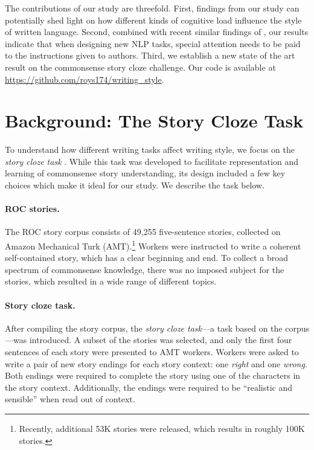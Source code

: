 \documentclass[11pt,a4paper]{article}
\newcommand{\isection}[2]{\section{#1}\label{ssec:#2}}
\begin{document}
The contributions of our study are threefold. 
First, findings from our study can potentially shed light on 
how different kinds of cognitive load influence the style of written language. 
Second, combined with recent similar findings of \cite{Cai:2017}, our results indicate that when designing new NLP tasks, special attention needs to be paid to the instructions given to authors.
Third, we establish a new state of the art result on the commonsense story cloze challenge. 
Our code is available at \url{https://github.com/roys174/writing_style}.

\isection{Background: The Story Cloze Task}{ROC_Story}
To understand how different writing tasks affect writing style, 
we focus on the \textit{story cloze task} \cite{Mostafazadeh:2016}. 
While this task was developed to facilitate representation and learning of commonsense story understanding,
its design included a few key choices which  make it ideal for our study. 
We describe the task below.




\paragraph{ROC stories.}

The ROC story corpus consists of 49,255 five-sentence 
stories, collected on Amazon Mechanical Turk (AMT).\footnote{Recently,
  additional 53K stories were released, which results in roughly
  100K stories.}
Workers were instructed to write a coherent self-contained story, which has a clear beginning and end. 
To collect a broad spectrum of commonsense knowledge, there was no imposed subject for the stories,
which resulted in a wide range of different topics.

\paragraph{Story cloze task.}
After compiling the story corpus, the {\it story cloze task}---a task based on the corpus---was introduced.
A subset of the stories was selected, and only the first four sentences of each story were presented to AMT workers.
Workers were asked to write a pair of new story endings for each story context: one {\it right} and one {\it wrong}.
Both endings were required to complete the story using one of the characters in the story context. 
Additionally,  the endings were required to be ``realistic and sensible'' \cite{Mostafazadeh:2016} when read out of context.
\end{document}
